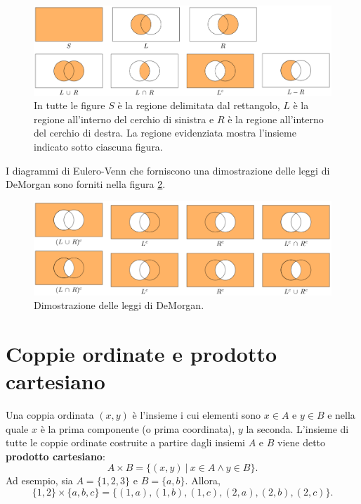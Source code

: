 \documentclass[
]{memoir}
\theoremstyle{definition}
\theoremstyle{definition}
\theoremstyle{definition}
\theoremstyle{definition}
\theoremstyle{remark}
\begin{document}
\begin{figure}

{\centering \includegraphics[width=1\linewidth]{images/sets-venn-diagrams} 

}

\caption{In tutte le figure $S$ è la regione delimitata dal rettangolo, $L$ è la regione all'interno del cerchio di sinistra e $R$ è la regione all'interno del cerchio di destra. La regione evidenziata mostra l'insieme indicato sotto ciascuna figura.}\label{fig:sets-venn-diagrams}
\end{figure}

I diagrammi di Eulero-Venn che forniscono una dimostrazione delle leggi
di DeMorgan sono forniti nella figura \ref{fig:demorgan}.

\begin{figure}

{\centering \includegraphics[width=1\linewidth]{images/demorgan} 

}

\caption{Dimostrazione delle leggi di DeMorgan.}\label{fig:demorgan}
\end{figure}

\hypertarget{coppie-ordinate-e-prodotto-cartesiano}{%
\section{Coppie ordinate e prodotto cartesiano}\label{coppie-ordinate-e-prodotto-cartesiano}}

Una coppia ordinata \((x,y)\) è l'insieme i cui elementi sono \(x \in A\) e
\(y \in B\) e nella quale \(x\) è la prima componente (o prima coordinata),
\(y\) la seconda. L'insieme di tutte le coppie ordinate costruite a
partire dagli insiemi \(A\) e \(B\) viene detto \textbf{prodotto cartesiano}:
\[A \times B = \{(x, y) ~\vert~ x \in A \land y \in B\}.\] Ad esempio,
sia \(A = \{1, 2, 3\}\) e \(B = \{a, b\}\). Allora,
\[\{1, 2\} \times \{a, b, c\} = \{(1, a), (1, b), (1, c), (2, a), (2, b), (2, c)\}.\]
\end{document}
